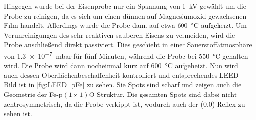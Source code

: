             Hingegen wurde bei der Eisenprobe nur ein Spannung von \SI{1}{\kilo\volt} gewählt um die Probe zu reinigen, da es sich um einen dünnen auf Magnesiumoxid gewachsenen Film handelt.
            Allerdings wurde die Probe dann auf etwa \SI{600}{\celsius} aufgeheizt.
            Um Verunreinigungen des sehr reaktiven sauberen Eisens zu vermeiden, wird die Probe anschließend direkt passiviert.
            Dies geschieht in einer Sauerstoffatmosphäre von \SI{1.3e-7}{\milli\bar} für fünf Minuten, während die Probe bei \SI{550}{\celsius} gehalten wird.
            Die Probe wird dann nocheinmal kurz auf \SI{600}{\celsius} aufgeheizt.
            Nun wird auch dessen Oberflächenbeschaffenheit kontrolliert und entsprechendes LEED-Bild ist in \autoref{fig:LEED_pFe} zu sehen.
            Sie Spots sind scharf und zeigen auch die Geometrie der Fe-p$(1 \times 1)$O Struktur.
            Die gesamten Spots sind dabei nicht zentrosymmetrisch, da die Probe verkippt ist, wodurch auch der (0,0)-Reflex zu sehen ist.
            
